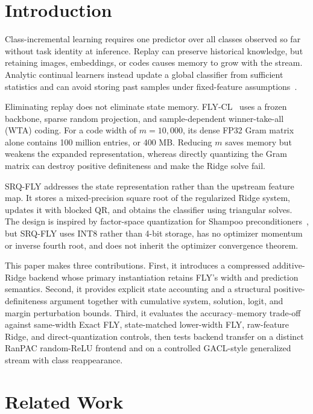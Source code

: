 \documentclass[runningheads]{llncs}
\begin{document}
\section{Introduction}

Class-incremental learning requires one predictor over all classes observed so
far without task identity at inference. Replay can preserve historical
knowledge, but retaining images, embeddings, or codes causes memory to grow
with the stream. Analytic continual learners instead update a global
classifier from sufficient statistics and can avoid storing past samples under
fixed-feature assumptions~\cite{zhuang2022acil,zhuang2024foal}.

Eliminating replay does not eliminate state memory. FLY-CL~\cite{zou2026flycl}
uses a frozen backbone, sparse random projection, and sample-dependent
winner-take-all (WTA) coding. For a code width of $m=10{,}000$, its dense FP32
Gram matrix alone contains 100 million entries, or 400 MB. Reducing $m$ saves
memory but weakens the expanded representation, whereas directly quantizing
the Gram matrix can destroy positive definiteness and make the Ridge solve
fail.

SRQ-FLY addresses the state representation rather than the upstream feature
map. It stores a mixed-precision square root of the regularized Ridge system,
updates it with blocked QR, and obtains the classifier using triangular solves.
The design is inspired by factor-space quantization for Shampoo
preconditioners~\cite{li2025fourbit}, but SRQ-FLY uses INT8 rather than 4-bit
storage, has no optimizer momentum or inverse fourth root, and does not inherit
the optimizer convergence theorem.

This paper makes three contributions. First, it introduces a compressed
additive-Ridge backend whose primary instantiation retains FLY's width and
prediction semantics. Second, it provides explicit state accounting and a
structural positive-definiteness argument together with cumulative system,
solution, logit, and margin perturbation bounds. Third, it evaluates the
accuracy--memory trade-off against same-width Exact FLY, state-matched
lower-width FLY, raw-feature Ridge, and direct-quantization controls, then
tests backend transfer on a distinct RanPAC random-ReLU frontend and on a
controlled GACL-style generalized stream with class reappearance.

\section{Related Work}
\end{document}
